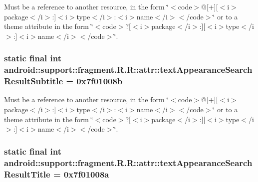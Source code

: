 Must be a reference to another resource, in the form \char`\"{}$<$code$>$@\mbox{[}+\mbox{]}\mbox{[}$<$i$>$package$<$/i$>$:\mbox{]}$<$i$>$type$<$/i$>$:$<$i$>$name$<$/i$>$$<$/code$>$\char`\"{} or to a theme attribute in the form \char`\"{}$<$code$>$?\mbox{[}$<$i$>$package$<$/i$>$:\mbox{]}\mbox{[}$<$i$>$type$<$/i$>$:\mbox{]}$<$i$>$name$<$/i$>$$<$/code$>$\char`\"{}. \hypertarget{classandroid_1_1support_1_1fragment_1_1_r_1_1attr_5c3fa077731c2449e2a638c4930c0337}{
\subsubsection[{textAppearanceSearchResultSubtitle}]{\setlength{\rightskip}{0pt plus 5cm}static final int android::support::fragment.R.R::attr::textAppearanceSearchResultSubtitle = 0x7f01008b}}
\label{classandroid_1_1support_1_1fragment_1_1_r_1_1attr_5c3fa077731c2449e2a638c4930c0337}


Must be a reference to another resource, in the form \char`\"{}$<$code$>$@\mbox{[}+\mbox{]}\mbox{[}$<$i$>$package$<$/i$>$:\mbox{]}$<$i$>$type$<$/i$>$:$<$i$>$name$<$/i$>$$<$/code$>$\char`\"{} or to a theme attribute in the form \char`\"{}$<$code$>$?\mbox{[}$<$i$>$package$<$/i$>$:\mbox{]}\mbox{[}$<$i$>$type$<$/i$>$:\mbox{]}$<$i$>$name$<$/i$>$$<$/code$>$\char`\"{}. \hypertarget{classandroid_1_1support_1_1fragment_1_1_r_1_1attr_60a08559e4b542bc737e52d434e854c4}{
\subsubsection[{textAppearanceSearchResultTitle}]{\setlength{\rightskip}{0pt plus 5cm}static final int android::support::fragment.R.R::attr::textAppearanceSearchResultTitle = 0x7f01008a}}
\label{classandroid_1_1support_1_1fragment_1_1_r_1_1attr_60a08559e4b542bc737e52d434e854c4}


